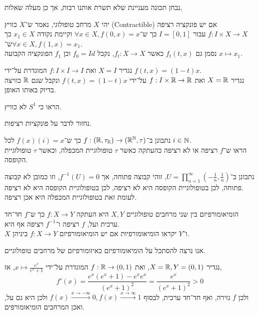 נבחן תכונה מעניינת שלא תשרת אותנו רבות, אך כן מעלה שאלות,
\begin{definition}
	יהי $X$ מרחב טופולוגי, נאמר ש־$X$ כוויץ (Contractible) אם יש פונקציה רציפה $f : I \times X \to X$ עבור $I = [0, 1]$ כך ש־$\forall x \in X, f(0, x) = x$ וקיימת נקודה $x_1 \in X$ כך ש־$\forall x \in X, f(1, x) = x_1$. \\
	נסמן גם $f_t(t, x)$ כאשר $f_t : X \to X$, נקבל $f_0 = Id$ וכן $f_1$ הפונקציה הקבועה $x \mapsto x_1$.
\end{definition}
\begin{example}
	נגדיר $X = I$ ואת $f : I \times I \to I$ המוגדרת על־ידי $f(t, x) = (1 - t)x$. \\
	נגדיר $X = \mathbb{R}$ ואת $f : I \times \mathbb{R} \to \mathbb{R}$ על־ידי $f(t, x) = (1 - t)x$ ונקבל שגם $\mathbb{R}$ כוויצה בדיוק באותו האופן.
\end{example}
\begin{exercise}
	הראו כי $S^1$ לא כוויץ.
\end{exercise}
נחזור לדבר על פונקציות רציפות.
\begin{exercise}
	נתבונן ב־$f : (\mathbb{R}, \tau_{\mathbb{R}}) \to (\mathbb{R}^{\mathbb{N}}, \tau)$ כך ש־$f(x)(i) = x$ לכל $i \in \mathbb{N}$. \\
	הראו ש־$f$ רציפה או לא רציפה כהעתקה כאשר $\tau$ טופולוגיית המכפלה, וכאשר $\tau$ טופולוגיית הקופסה.
\end{exercise}
\begin{solution}
	נתבונן ב־$U = \prod_{n = 1}^\infty (-\frac{1}{n}, \frac{1}{n})$, זוהי קבוצה פתוחה, אך $f^{-1}(U) = 0$, וזו כמובן לא קבוצה פתוחה, לכן בטופולוגיית הקופסה היא לא רציפה, לכן בטופולוגיית הקופסה היא לא רציפה. \\
	לעומת זאת בטופולוגיית המכפלה היא אכן רציפה.
\end{solution}
\begin{definition}[הומיאומורפיזם]
	הומיאומורפיזם בין שני מרחבים טופולוגיים $X, Y$ היא העתקה $f : X \to Y$ כך ש־$f$ חד־חד ערכית ועל, $f$ רציפה ו־$f^{-1}$ רציפה אף היא. \\
	$X$ ו־$Y$ יקראו הומיאומורפיות אם יש הומיאומורפיזם $f : X \to Y$ ביניהן.
\end{definition}
אנו נרצה להסתכל על הומיאומורפיזם כאיזומורפיזם של מרחבים טופולוגיים.
\begin{example}
	נגדיר $X = \mathbb{R}, Y = (0, 1)$, ואת $f : \mathbb{R} \to (0, 1)$ המוגדרת על־ידי $x \mapsto \frac{e^x}{e^x + 1}$, אז,
	\[
		f'(x)
		= \frac{e^x(e^x + 1) - e^x e^x}{{(e^x + 1)}^2}
		= \frac{e^x}{{(e^x + 1)}^2}
		> 0
	\]
	ולכן $f$ גזירה, ואף חד־חד ערכית, לבסוף $f(x) \xrightarrow{x \to -\infty} 0, f(x) \xrightarrow{x \to \infty} 1$ ולכן היא גם על, ואכן המרחבים הומיאומורפים.
\end{example}
